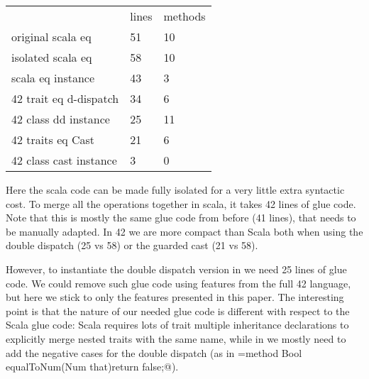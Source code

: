 \begin{minipage}{0.4\textwidth}
\begin{tabular}{l |l |l}
&                              lines  &   methods\\
original scala eq           &    51   &   10\\
isolated scala eq           &   58    &   10\\
scala eq instance           &    43   &    3\\
42 trait eq d-dispatch      &    34   &    6\\
42 class dd instance        &    25   &   11\\
42 traits eq Cast            &    21   &    6\\
42 class cast instance      &     3   &    0\\
\end{tabular}
\end{minipage}
\begin{minipage}{0.6\textwidth}
Here the scala code can be made fully isolated for a very little
extra syntactic cost.
To merge all the operations together in scala, it
takes 42 lines of glue code. Note that this
is mostly the same glue code from before (41 lines), that
needs to be manually adapted.
In 42 we are
more compact than Scala both when using the double dispatch (25 vs 58)
or the guarded cast (21 vs 58).
\end{minipage}

However, to instantiate the double dispatch 
version in \name we need 25 lines of glue code.
We could remove such glue code using 
features from the full 42 language, but here we stick to only the features presented in this paper.
The interesting point is that the nature of our needed glue code 
is different with respect to the Scala glue code:
Scala requires lots of trait multiple inheritance declarations to explicitly merge
nested traits with the same name, while in \name we mostly need 
to add the negative cases for the double dispatch (as in
\Q@Sum={method Bool equalToNum(Num that){return false;}}@).


